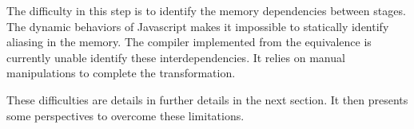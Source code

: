 The difficulty in this step is to identify the memory dependencies between stages.
The dynamic behaviors of Javascript makes it impossible to statically identify aliasing in the memory.
The compiler implemented from the equivalence is currently unable identify these interdependencies.
It relies on manual manipulations to complete the transformation.

\separator

These difficulties are details in further details in the next section.
It then presents some perspectives to overcome these limitations.